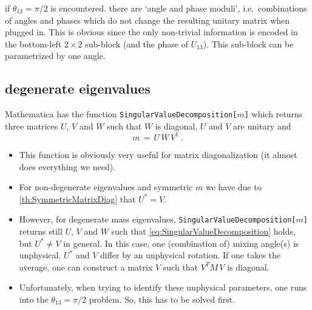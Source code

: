 \documentclass[12pt,a4paper,twoside]{scrartcl}
\newcommand{\function}[1]{{\tt #1}}
\numberwithin{equation}{section}
\numberwithin{table}{section}
\begin{document}
if $\theta_{13}=\pi/2$ is encountered. there are `angle and phase moduli', i.e.\
combinations of angles and phases which do not change the resulting unitary
matrix when plugged in. This is obvious since the only non-trivial information
is encoded in the bottom-left $2\times2$ sub-block (and the phase of $U_{13}$).
This sub-block can be parametrized by one angle.

\subsection*{degenerate eigenvalues}

Mathematica has the function \function{SingularValueDecomposition[$m$]} which
returns three matrices $U$, $V$ and $W$ such that $W$ is diagonal, $U$ and
$V$ are unitary and 
\begin{equation}\label{eq:SingularValueDecomposition}
 m\,=\,U\,W\,V^\dagger\;.
\end{equation} 
\begin{itemize}
 \item This function is obviously very  useful for matrix diagonalization (it almost
does everything we need). 
 \item For non-degenerate eigenvalues and symmetric $m$ we
have due to \ref{th:SymmetricMatrixDiag} that $U^*=V$.
 \item However, for degenerate mass eigenvalues,
\function{SingularValueDecomposition[$m$]} returns still $U$, $V$ and $W$ such
that \eqref{eq:SingularValueDecomposition} holds, but $U^*\ne V$ in general.
In this case, one (combination of) mixing angle(s) is unphysical. $U^*$  and $V$
differ by an unphysical rotation. If one takes the average, one can construct a
matrix $V$ such that $V^TM\,V$ is diagonal.
 \item Unfortunately, when trying to identify these unphysical parameters, one
 runs into the $\theta_{13}=\pi/2$ problem. So, this has to be solved first.
\end{itemize}
\end{document}
